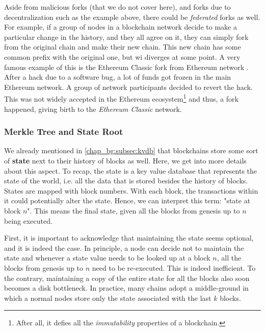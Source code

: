 Aside from malicious forks (that we do not cover here), and forks due to decentralization such as
the example above, there could be \textit{federated} forks as well. For example, if a group of nodes
in a blockchain network decide to make a particular change in the history, and they all agree on it,
they can simply fork from the original chain and make their new chain. This new chain has some
common prefix with the original one, but wi diverges at some point. A very famous example of this is
the Ethereum Classic fork from Ethereum network \cite{vignaGreatDigitalCurrencyDebate2016}. After a
hack due to a software bug, a lot of funds got frozen in the main Ethereum network. A group of
network participants decided to revert the hack. This was not widely accepted in the Ethereum
ecosystem\footnote{After all, it defies all the \textit{immutability} properties of a blockchain.}
and thus, a fork happened, giving birth to the \textit{Ethereum Classic} network.



\subsubsection{Merkle Tree and State Root} \label{chap_bg:subsec:trie}

We already mentioned in \ref{chap_bg:subsec:kvdb} that blockchains store some sort of \textbf{state}
next to their history of blocks as well. Here, we get into more details about this aspect. To recap,
the state is a key value database that represents the state of the world, i.e. all the data that is
stored besides the history of blocks. States are mapped with block numbers. With each block, the
transactions within it could potentially alter the state. Hence, we can interpret this term: "state
at block $n$". This means the final state, given all the blocks from genesis up to $n$ being
executed.

First, it is important to acknowledge that maintaining the state seems optional, and it is indeed
the case. In principle, a node can decide not to maintain the state and whenever a state value needs
to be looked up at a block $n$, all the blocks from genesis up to $n$ need to be re-executed. This
is indeed inefficient. To the contrary, maintaining a copy of the entire state for all the blocks
also soon becomes a disk bottleneck. In practice, many chains adopt a middle-ground in which a
normal nodes store only the state associated with the last $k$ blocks.

